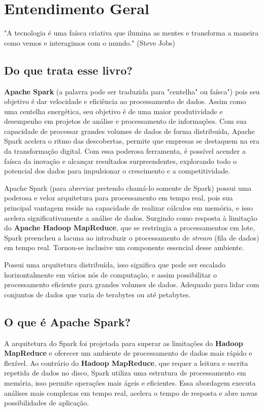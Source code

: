\chapter{Entendimento Geral}

\begin{remark}
"A tecnologia é uma faísca criativa que ilumina as mentes e transforma a maneira como vemos e interagimos com o mundo." (Steve Jobs) 
\end{remark}

\section{Do que trata esse livro?}
\textbf{Apache Spark} (a palavra pode ser traduzida para "centelha" ou faísca") pois seu objetivo é dar velocidade e eficiência ao processamento de dados. Assim como uma centelha energética, seu objetivo é de uma maior produtividade e desempenho em projetos de análise e processamento de informações. Com sua capacidade de processar grandes volumes de dados de forma distribuída, Apache Spark acelera o ritmo das descobertas, permite que empresas se destaquem na era da transformação digital. Com essa poderosa ferramenta, é possível acender a faísca da inovação e alcançar resultados surpreendentes, explorando todo o potencial dos dados para impulsionar o crescimento e a competitividade.

Apache Spark (para abreviar pretendo chamá-lo somente de Spark) possui uma poderosa e veloz arquitetura para processamento em tempo real, pois sua principal vantagem reside na capacidade de realizar cálculos em memória, e isso acelera significativamente a análise de dados. Surgindo como resposta à limitação do \textbf{Apache Hadoop MapReduce}, que se restringia a processamentos em lote, Spark preencheu a lacuna ao introduzir o processamento de \textit{stream} (fila de dados) em tempo real. Tornou-se inclusive um componente essencial desse ambiente.

Possui uma arquitetura distribuída, isso significa que pode ser escalado horizontalmente em vários nós de computação, e assim possibilitar o processamento eficiente para grandes volumes de dados. Adequado para lidar com conjuntos de dados que varia de terabytes ou até petabytes.

\section{O que é Apache Spark?}
A arquitetura do Spark foi projetada para superar as limitações do \textbf{Hadoop MapReduce} e oferecer um ambiente de processamento de dados mais rápido e flexível. Ao contrário do \textbf{Hadoop MapReduce}, que requer a leitura e escrita repetida de dados no disco, Spark utiliza uma estrutura de processamento em memória, isso permite operações mais ágeis e eficientes. Essa abordagem executa análises mais complexas em tempo real, acelera o tempo de resposta e abre novas possibilidades de aplicação.

